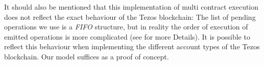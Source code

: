 		It should also be mentioned that this implementation of multi contract execution
		does not reflect the exact behaviour of the Tezos blockchain:
		The list of pending operations we use is a \emph{FIFO} structure,
		but in reality the order of execution of emitted operations is more complicated
		(see \cite{devres} for more Details).
		It is possible to reflect this behaviour when implementing
		the different account types of the Tezos blockchain.
		Our model suffices as a proof of concept.



\begin{comment}

\subsubsection{Shadow Stack and extended Instructions/Programs}\label{subsec:shadow}

\ADT{DIP} and \ADT{ITER} are special in that they need a second stack to be executed:
During the execution of the sub-program of \verb=DIP= the top \verb=n= elements must be stored
to be later retrieved when sub-program execution has terminated.
Likewise for \verb=ITER=, which consumes the list at the top of the stack
by executing its sub-program for every list element.
Here the currently remaining list has to be stored during sub-program execution.
Since the sub-programs can also contain such instructions that need to store data away for later,
a second stack is needed, as well as new instructions to operate on it:
To execute \texttt{DIP n prg ; \emph{remainingProg}}, the top \verb=n= elements of the
main stack are transfered to this second stack (we call it the \emph{shadow stack}) and
the instruction is replaced by \verb=prg= followed by the \emph{shadow instruction} \verb=DIP'=
which retrieves them from the shadow stack and puts them back onto the mainstack
before continuing execution with \texttt{\emph{remainingProg}}.
For the instruction \verb=ITER prg= the list on top of the main stack will be placed
onto the shadow stack and the instruction will be replaced by its shadow version \verb=ITER' prg=
which does all the actual work: It checks if the list at the top of the shadow stack is empty.
If so, it will be dropped and execution continues.
If not, the first element in the list will be moved to the top of the main stack and
\verb=prg= will be executed. After that \verb=ITER'= is executed again to check the list
until all elements have been iterated over.

These new shadow instructions must therefore be parameterized by 4 stacks:
main input stack, shadow input stack, main output stack and shadow output stack.
Analogous to the abbreviations in our code we will call the main stack \emph{real stack}.


\end{comment}
